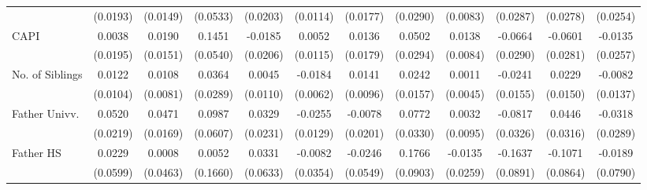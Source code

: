 \begin{table}[htbp]
\begin{tabular}{l*{11}{c}}
            &    (0.0193)         &    (0.0149)         &    (0.0533)         &    (0.0203)         &    (0.0114)         &    (0.0177)         &    (0.0290)         &    (0.0083)         &    (0.0287)         &    (0.0278)         &    (0.0254)         \\
\addlinespace
CAPI        &      0.0038         &      0.0190         &      0.1451\sym{**} &     -0.0185         &      0.0052         &      0.0136         &      0.0502         &      0.0138         &     -0.0664\sym{*}  &     -0.0601\sym{*}  &     -0.0135         \\
            &    (0.0195)         &    (0.0151)         &    (0.0540)         &    (0.0206)         &    (0.0115)         &    (0.0179)         &    (0.0294)         &    (0.0084)         &    (0.0290)         &    (0.0281)         &    (0.0257)         \\
\addlinespace
No. of Siblings&      0.0122         &      0.0108         &      0.0364         &      0.0045         &     -0.0184\sym{**} &      0.0141         &      0.0242         &      0.0011         &     -0.0241         &      0.0229         &     -0.0082         \\
            &    (0.0104)         &    (0.0081)         &    (0.0289)         &    (0.0110)         &    (0.0062)         &    (0.0096)         &    (0.0157)         &    (0.0045)         &    (0.0155)         &    (0.0150)         &    (0.0137)         \\
\addlinespace
Father Univv.&      0.0520\sym{*}  &      0.0471\sym{**} &      0.0987         &      0.0329         &     -0.0255\sym{*}  &     -0.0078         &      0.0772\sym{*}  &      0.0032         &     -0.0817\sym{*}  &      0.0446         &     -0.0318         \\
            &    (0.0219)         &    (0.0169)         &    (0.0607)         &    (0.0231)         &    (0.0129)         &    (0.0201)         &    (0.0330)         &    (0.0095)         &    (0.0326)         &    (0.0316)         &    (0.0289)         \\
\addlinespace
Father HS   &      0.0229         &      0.0008         &      0.0052         &      0.0331         &     -0.0082         &     -0.0246         &      0.1766         &     -0.0135         &     -0.1637         &     -0.1071         &     -0.0189         \\
            &    (0.0599)         &    (0.0463)         &    (0.1660)         &    (0.0633)         &    (0.0354)         &    (0.0549)         &    (0.0903)         &    (0.0259)         &    (0.0891)         &    (0.0864)         &    (0.0790)         \\

\end{tabular}
\end{table}
